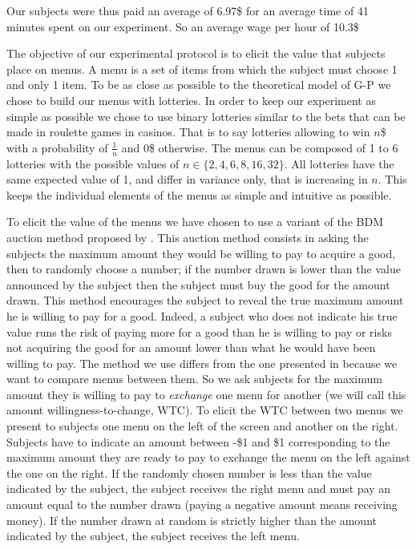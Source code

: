 \documentclass[
]{book}
\begin{document}
Our subjects were thus paid an average of 6.97\$ for
an average time of 41 minutes spent on our experiment.
So an average wage per hour of
10.3\$

The objective of our experimental protocol is to elicit the value that subjects
place on menus.
A menu is a set of items from which the subject must choose 1 and only 1 item.
To be as close as possible to the theoretical model of G-P we chose to build our
menus with lotteries.
In order to keep our experiment as simple as possible we chose to use binary
lotteries similar to the bets that can be made in roulette games in casinos.
That is to say lotteries allowing to win \(n\)\$ with a probability of \(\frac{1}{n}\)
and 0\$ otherwise.
The menus can be composed of 1 to 6 lotteries with the possible values of
\(n \in \{2, 4, 6, 8, 16, 32\}\).
All lotteries have the same expected value of 1, and differ in variance only,
that is increasing in \(n\).
This keeps the individual elements of the menus as simple and intuitive as
possible.

To elicit the value of the menus we have chosen to use a variant of the BDM auction
method proposed by \citet{becker1964measuring}.
This auction method consists in asking the subjects the maximum amount they
would be willing to pay to acquire a good, then to randomly choose a number;
if the number drawn is lower than the value announced by the subject then the
subject must buy the good for the amount drawn.
This method encourages the subject to reveal the true maximum amount he is willing to
pay for a good.
Indeed, a subject who does not indicate his true value runs the risk of paying
more for a good than he is willing to pay or risks not acquiring the good for an
amount lower than what he would have been willing to pay.
The method we use differs from the one presented in \citet{becker1964measuring} because
we want to compare menus between them.
So we ask subjects for the maximum amount they is willing to pay to \emph{exchange} one
menu for another (we will call this amount willingness-to-change, WTC).
To elicit the WTC between two menus we present to subjects one menu on
the left of the screen and another on the right. Subjects have to indicate an amount
between -\$1 and \$1 corresponding to the maximum amount they are ready to pay to
exchange the menu on the left against the one on the right.
If the randomly chosen number is less than the value indicated by the subject,
the subject receives the right menu and must pay an amount equal to the number
drawn (paying a negative amount means receiving money).
If the number drawn at random is strictly higher than the amount indicated by
the subject, the subject receives the left menu.
\end{document}
